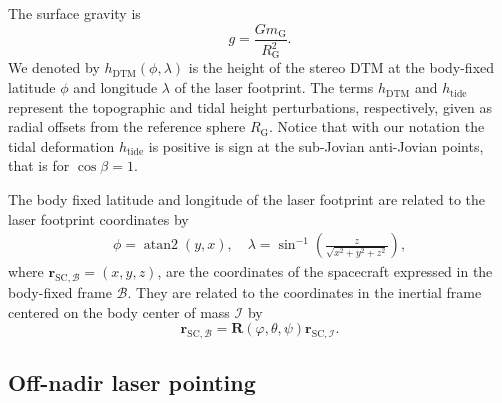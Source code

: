 \documentclass[pdflatex,sn-mathphys-num]{sn-jnl}%
\theoremstyle{thmstyleone}%
\theoremstyle{thmstyletwo}%
\theoremstyle{thmstylethree}%
\DeclareMathOperator{\atantwo}{atan2}
\renewcommand{\vec}[1]{\boldsymbol{#1}}
\begin{document}
The surface gravity is 
\begin{equation}
	\label{eq:surface_gravity}
	g = \frac{G m_{\mathrm{G}}}{R_{\mathrm{G}}^2}.
\end{equation}
%
We denoted by $h_{\mathrm{DTM}}(\phi, \lambda)$  is the height of the stereo DTM at the body-fixed latitude \(\phi\) and longitude \(\lambda\) of the laser footprint.
%
The terms $h_{\mathrm{DTM}}$ and $h_{\mathrm{tide}}$ represent the topographic and tidal height perturbations, respectively, given as radial offsets from the reference sphere $R_{\mathrm{G}}$.
%
Notice that with our notation the tidal deformation $h_{\mathrm{tide}}$ is positive is sign at the sub-Jovian anti-Jovian points, that is for ${\cos\beta = 1}$. 

The body fixed latitude and longitude of the laser footprint are related to the laser footprint coordinates by
\begin{align}
	\phi = \atantwo \left(y,x\right), \quad
	\lambda = \sin^{-1} \left(\frac{z}{\sqrt{x^2 + y^2 + z^2}}\right), 
\end{align}
where ${\vec{r}_{\mathrm{SC},\mathcal{B}} = (x,y,z)}$, are the coordinates of the spacecraft expressed in the body-fixed frame $\mathcal{B}$. They are related to the coordinates in the inertial frame centered on the body center of mass $\mathcal{I}$ by
\begin{equation}
	\vec{r}_{\mathrm{SC},\mathcal{B}}  = \vec{R}(\varphi,\theta,\psi) \vec{r}_{\mathrm{SC},\mathcal{I}}.
\end{equation}



\subsection{Off-nadir laser pointing}
\end{document}
